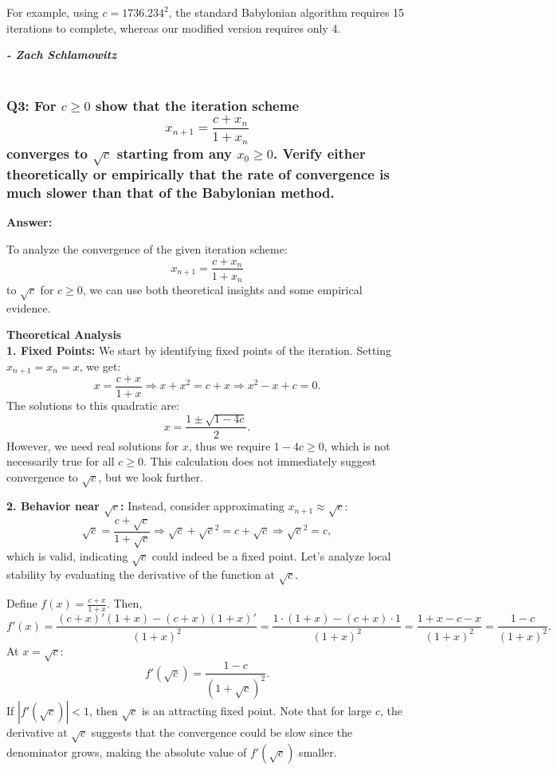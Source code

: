 \documentclass{article}
\begin{document}
For example, using $c = 1736.234^2$, the standard Babylonian algorithm requires 15 iterations to complete, whereas our modified version requires only 4.

\textbf{\textit{- Zach Schlamowitz }} \\\\

\subsubsection*{Q3:  For $c \geq 0$ show that the iteration scheme
\[
x_{n+1} = \frac{c + x_n}{1 + x_n}
\]
converges to $\sqrt{c}$ starting from any $x_0 \geq 0$. Verify either theoretically or empirically that the rate of convergence is much slower than that of the Babylonian method.}

\textbf{Answer:}

To analyze the convergence of the given iteration scheme:
\[
x_{n+1} = \frac{c + x_n}{1 + x_n}
\]
to $\sqrt{c}$ for $c \geq 0$, we can use both theoretical insights and some empirical evidence.

\textbf{Theoretical Analysis}\\
\textbf{1. Fixed Points:} We start by identifying fixed points of the iteration. Setting $x_{n+1} = x_n = x$, we get:
   \[
   x = \frac{c + x}{1 + x} \Rightarrow x + x^2 = c + x \Rightarrow x^2 - x + c = 0.
   \]
   The solutions to this quadratic are:
   \[
   x = \frac{1 \pm \sqrt{1 - 4c}}{2}.
   \]
   However, we need real solutions for $x$, thus we require $1 - 4c \geq 0$, which is not necessarily true for all $c \geq 0$. This calculation does not immediately suggest convergence to $\sqrt{c}$, but we look further.

\textbf{2. Behavior near $\sqrt{c}$:} Instead, consider approximating $x_{n+1} \approx \sqrt{c}$:
   \[
   \sqrt{c} = \frac{c + \sqrt{c}}{1 + \sqrt{c}} \Rightarrow \sqrt{c} + \sqrt{c}^2 = c + \sqrt{c} \Rightarrow \sqrt{c}^2 = c,
   \]
   which is valid, indicating $\sqrt{c}$ could indeed be a fixed point. Let’s analyze local stability by evaluating the derivative of the function at $\sqrt{c}$.

   Define $f(x) = \frac{c + x}{1 + x}$. Then,
   \[
   f'(x) = \frac{(c + x)'(1 + x) - (c + x)(1 + x)'}{(1 + x)^2} = \frac{1 \cdot (1 + x) - (c + x) \cdot 1}{(1 + x)^2} = \frac{1 + x - c - x}{(1 + x)^2} = \frac{1 - c}{(1 + x)^2}.
   \]
   At $x = \sqrt{c}$:
   \[
   f'(\sqrt{c}) = \frac{1 - c}{(1 + \sqrt{c})^2}.
   \]
   If $|f'(\sqrt{c})| < 1$, then $\sqrt{c}$ is an attracting fixed point. Note that for large $c$, the derivative at $\sqrt{c}$ suggests that the convergence could be slow since the denominator grows, making the absolute value of $f'(\sqrt{c})$ smaller.\\
\end{document}

